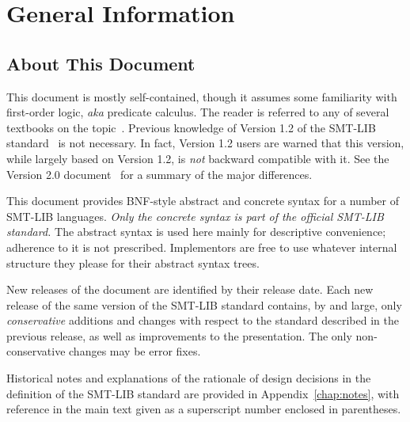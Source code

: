 

\chapter{General Information}
\thispagestyle{empty}


\section{About This Document}

This document is mostly self-contained, though 
it assumes some familiarity with first-order logic, \emph{aka} predicate calculus.
The reader is referred to any of several textbooks on the to\-pic~\cite{Gal-86,Fit-96,Hen-01,Men-09}. 
Previous knowledge of Version 1.2 of the SMT-LIB standard~\cite{RanTin-RR-06}
is not necessary.
In fact, Version 1.2 users are warned that this version,
while largely based on Version 1.2, 
is \emph{not} backward compatible with it.
See the Version 2.0 document~\cite{BarST-RR-10} for a summary of the major differences.

This document provides BNF-style abstract and concrete syntax 
for a number of SMT-LIB languages.
\emph{Only the concrete syntax is part of the official SMT-LIB standard.}
The abstract syntax is used here mainly for descriptive convenience;
adherence to it is not prescribed.
Implementors are free to use whatever internal structure 
they please for their abstract syntax trees.
\medskip

New releases of the document are identified by their release date.
Each new release of the same version of the SMT-LIB standard 
contains, by and large, only \emph{conservative} additions and 
changes with respect to the standard described in the previous release,
as well as improvements to the presentation.
The only non-conservative changes may be error fixes.

Historical notes and 
explanations of the rationale of design decisions
in the definition of the SMT-LIB standard are provided 
in Appendix~\ref{chap:notes}, 
with reference in the main text given as a superscript number 
enclosed in parentheses.

